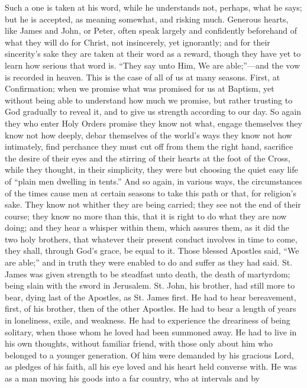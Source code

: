 Such a one is taken at his word, while he understands not, perhaps,
what he says; but he is accepted, as meaning somewhat, and risking
much. Generous hearts, like James and John, or Peter, often speak
largely and confidently beforehand of what they will do for Christ,
not insincerely, yet ignorantly; and for their sincerity's sake they
are taken at their word as a reward, though they have yet to learn how
serious that word is. ``They say unto Him, We are able;''—and
the vow is recorded in heaven. This is the case of all of us at many
seasons. First, at Confirmation; when we promise what was promised for
us at Baptism, yet without being able to understand how much we
promise, but rather trusting to God gradually to reveal it, and to
give us strength according to our day. So again they who enter Holy
Orders promise they know not what, engage themselves they know not how
deeply, debar themselves of the world's ways they know not how
intimately, find perchance they must cut off from them the right hand,
sacrifice the desire of their eyes and the stirring of their hearts at
the foot of the Cross, while they thought, in their simplicity, they
were but choosing the quiet easy life of ``plain men dwelling in
tents.'' And so again, in various ways, the circumstances of the
times cause men at certain seasons to take this path or that, for
religion's sake. They know not whither they are being carried; they
see not the end of their course; they know no more than this, that it
is right to do what they are now doing; and they hear a whisper within
them, which assures them, as it did the two holy brothers, that
whatever their present conduct involves in time to come, they shall,
through God's grace, be equal to it. Those blessed Apostles said,
``We are able;'' and in truth they were enabled to do and
suffer as they had said. St. James was given strength to be steadfast
unto death, the death of martyrdom; being slain with the sword in
Jerusalem. St. John, his brother, had still more to bear, dying last
of the Apostles, as St. James first. He had to hear bereavement,
first, of his brother, then of the other Apostles. He had to bear a
length of years in loneliness, exile, and weakness. He had to
experience the dreariness of being solitary, when those whom he loved
had been summoned away. He had to live in his own thoughts, without
familiar friend, with those only about him who belonged to a younger
generation. Of him were demanded by his gracious Lord, as pledges of
his faith, all his eye loved and his heart held converse with. He was
as a man moving his goods into a far country, who at intervals and by
